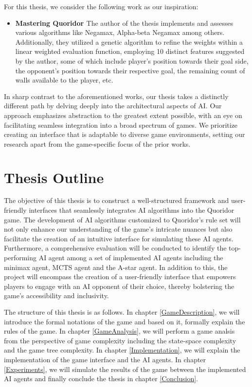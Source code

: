 For this thesis, we consider the following work as our inspiration:

\begin{itemize}
    \item \textbf{Mastering Quoridor \citep{Glendenning2002MasteringQ}}
    The author of the thesis implements and assesses various algorithms like Negamax, Alpha-beta Negamax among others. Additionally, they utilized a genetic algorithm to refine the weights within a linear weighted evaluation function, employing 10 distinct features suggested by the author, some of which include player's position towards their goal side, the opponent's position towards their respective goal, the remaining count of walls available to the player, etc.
\end{itemize}

In sharp contrast to the aforementioned works, our thesis takes a distinctly different path by delving deeply into the architectural aspects of AI. Our approach emphasizes abstraction to the greatest extent possible, with an eye on facilitating seamless integration into a broad spectrum of games. We prioritize creating an interface that is adaptable to diverse game environments, setting our research apart from the game-specific focus of the prior works.


\section{Thesis Outline}

The objective of this thesis is to construct a well-structured framework and user-friendly interfaces that seamlessly integrates AI algorithms into the Quoridor game. The development of AI algorithms customized to Quoridor's rule set will not only enhance our understanding of the game's intricate nuances but also facilitate the creation of an intuitive interface for simulating these AI agents. Furthermore, a comprehensive evaluation will be conducted to identify the top-performing AI agent among a set of implemented AI agents including the minimax agent, \gls{MCTS} agent and the A-star agent. In addition to this, the project will encompass the creation of a user-friendly interface that empowers players to engage with an AI opponent of their choice, thereby bolstering the game's accessibility and inclusivity.

The structure of this thesis is as follows. In chapter \ref{GameDescription}, we will introduce the formal notations of the game and based on it, formally explain the rules of the game. In chapter \ref{GameAnalysis}, we will perform a game analsis from the perspective of game complexity including the state-space complexity and the game tree complexity. In chapter \ref{Implementation}, we will explain the implementation of the game interface and the AI agents. In chapter \ref{Experiments}, we will simulate the results of the game between the implemented AI agents and finally conclude the thesis in chapter \ref{Conclusion}.


